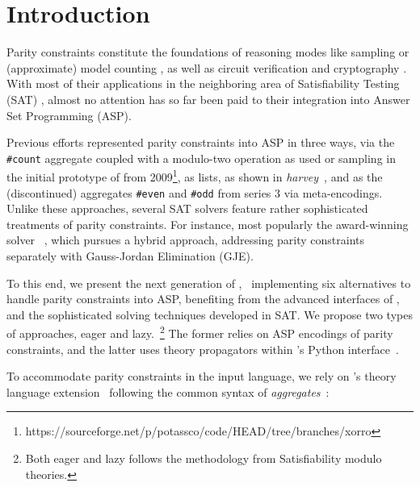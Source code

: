 \section{Introduction} \label{sec:introduction}
 Parity constraints constitute the foundations of reasoning modes like sampling or (approximate) model counting \cite{DBLP:journals/corr/abs-1806-02239}, as well as circuit verification and cryptography \cite{DBLP:conf/laitinen2014extending}.
 With most of their applications in the neighboring area of Satisfiability Testing (SAT) \cite{DBLP:journals/corr/abs-1806-02239},
 almost no attention has so far been paid to their integration into Answer Set Programming (ASP).%
 
 Previous efforts represented parity constraints into ASP in three ways,
 via the \texttt{\#count} aggregate coupled with a modulo-two operation as used or sampling in the initial prototype of \xorro{} from 2009\footnote{https://sourceforge.net/p/potassco/code/HEAD/tree/branches/xorro},
 as lists, as shown in \emph{harvey}~\cite{DBLP:conf/lpnmr/GresslerOT17},
 and as the (discontinued) aggregates \texttt{\#even} and \texttt{\#odd} from \gringo{} series 3 via meta-encodings.
 Unlike these approaches, several SAT solvers feature rather sophisticated treatments of parity constraints.
 For instance, most popularly the award-winning solver \cryptominisat~\cite{DBLP:conf/sat/SoosNC09}, which pursues a hybrid approach,
 addressing parity constraints separately with Gauss-Jordan Elimination (GJE).
 
 To this end, we present the next generation of \xorro,~\cite{DBLP:conf/lpnmr/EverardoJKS19}
 implementing six alternatives to handle parity constraints into ASP,
 benefiting from the advanced interfaces of \clingo{},
 and the sophisticated solving techniques developed in SAT.
 We propose two types of approaches, eager and lazy.~\footnote{Both eager and lazy follows the methodology from Satisfiability modulo theories.}
 The former relies on ASP encodings of parity constraints, and the latter uses theory propagators within \clingo{}’s Python interface~\cite{DBLP:conf/iclp/GebserKKOSW16}.
 
 To accommodate parity constraints in the input language,
 we rely on \clingo’s theory language extension~\cite{DBLP:conf/iclp/GebserKKOSW16}
 following the common syntax of \emph{aggregates}~\cite{DBLP:journals/tplp/GebserHKLS15}:
 
